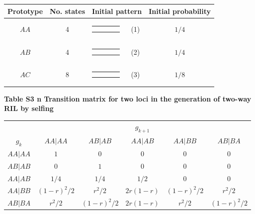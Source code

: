 \documentclass[9pt,letterpaper,twoside]{article}
\begin{document}
{
\begin{center}
\begin{tabular}{ccrlc} \hline
Prototype & No. states & \multicolumn{2}{c}{Initial pattern} & Initial probability \\ \hline
$AA$ & 4 & 
{\renewcommand{\arraystretch}{0.3}
\renewcommand{\tabcolsep}{0.5mm}
\parbox[b][3mm][c]{12mm}{
\begin{tabular}{|p{2mm}|p{2mm}||p{2mm}|p{2mm}|} \hline
$\bullet$ &           &           &           \\
$\bullet$ &           &           &           \\ \hline
\end{tabular}}}
& (1) & $1/4$ \\
$AB$ & 4 & 
{\renewcommand{\arraystretch}{0.3}
\renewcommand{\tabcolsep}{0.5mm}
\parbox[b][3mm][c]{12mm}{
\begin{tabular}{|p{2mm}|p{2mm}||p{2mm}|p{2mm}|} \hline
$\bullet$ &           &           &           \\
          & $\bullet$ &           &           \\ \hline
\end{tabular}}}
& (2) & $1/4$ \\
$AC$ & 8 & 
{\renewcommand{\arraystretch}{0.3}
\renewcommand{\tabcolsep}{0.5mm}
\parbox[b][3mm][c]{12mm}{
\begin{tabular}{|p{2mm}|p{2mm}||p{2mm}|p{2mm}|} \hline
$\bullet$ &           &           &           \\
          &           & $\bullet$ &           \\ \hline
\end{tabular}}}
& (3) & $1/8$ \\
\hline
\end{tabular}
\end{center}
}

\bigskip

\newpage

\noindent \textbf{Table S3 {\color{white} n} Transition matrix for two loci
in the generation of two-way RIL by selfing}

\bigskip

{
\begin{center}
{\renewcommand{\arraystretch}{1.5}\begin{tabular}{cccccc} \hline
& \multicolumn{5}{c}{$g_{k+1}$} \\ \cline{2-6}
$g_k$ & $AA|AA$ & $AB|AB$ & $AA|AB$ & $AA|BB$ & $AB|BA$  \\ \hline 
$AA|AA$ & $1$ & $0$ & $0$ & $0$ & $0$ \\ 
$AB|AB$ & $0$ & $1$ & $0$ & $0$ & $0$ \\ 
$AA|AB$ & $1/4$ & $1/4$ & $1/2$ & $0$ & $0$ \\ 
$AA|BB$ & $(1-r)^2/2$ & $r^2/2$ & $2r(1-r)$ & $(1-r)^2/2$ & $r^2/2$ \\ 
$AB|BA$ & $r^2/2$ & $(1-r)^2/2$ & $2r(1-r)$ & $r^2/2$ & $(1-r)^2/2$ \\ 
\hline
\end{tabular} }
\end{center}

}
\end{document}

